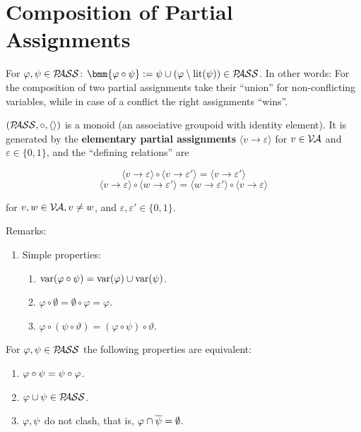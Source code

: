 \documentclass[12pt]{book}
\begin{document}
\section{Composition of Partial Assignments}
\label{sec:Compositionpass}

\begin{defi}\label{def:comppass}
  For $\varphi, \psi \in \mathcal{P\hspace{-0.32em}ASS}$: $\bmm{\vp \circ \psi} := \psi \cup (\vp \sm \lit(\psi)) \in \Pass$.
  In other words: For the composition of two partial assignments take their ``union'' for non-conflicting variables, while in case of a conflict the right assignments ``wins''.
\end{defi}

\begin{lem}\label{lem:passmon}
  $(\mathcal{P\hspace{-0.32em}ASS},\circ,\langle  \rangle)$ is a monoid (an associative groupoid with identity element). It is generated by 
  the \textbf{elementary partial assignments} $\langle v\to \varepsilon\rangle$ for $v\in \mathcal{V\hspace{-0.1em}A}$ and $\varepsilon \in \{0,1\}$, and the ``defining relations'' are
  
$$\langle v\to \varepsilon \rangle \circ \langle v\to \varepsilon' \rangle = \langle v\to \varepsilon' \rangle $$
$$\langle v\to \varepsilon \rangle \circ \langle w\to \varepsilon' \rangle = \langle w\to \varepsilon' \rangle \circ \langle v\to \varepsilon \rangle$$

for $v, w\in \mathcal{V\hspace{-0.1em}A}, v\neq w$, and $\varepsilon, \varepsilon' \in \{0, 1\}$.

\end{lem}

Remarks:
\begin{enumerate}
\item Simple properties:
   \begin{enumerate}
     \item $\operatorname{var}(\varphi \circ \psi)  = \operatorname{var}(\varphi)\cup \operatorname{var}(\psi)$.
     \item $\varphi \circ \emptyset  = \emptyset \circ \varphi = \varphi$.
     \item $\varphi \circ (\psi \circ \vartheta) = (\varphi \circ \psi) \circ \vartheta$.
    \end{enumerate}
 \end{enumerate}

\begin{lem}\label{lem:comcomp}
  For $\varphi, \psi \in \mathcal{P\hspace{-0.32em}ASS}$ the following properties are equivalent:
  \begin{enumerate}
  \item $\varphi \circ \psi = \psi \circ \varphi$.
  \item $\varphi \cup \psi \in \mathcal{P\hspace{-0.32em}ASS}$.
  \item $\varphi, \psi$ do not clash, that is, $\varphi \cap \overline{\psi} = \emptyset$.
  \end{enumerate}
\end{lem}
\end{document}
